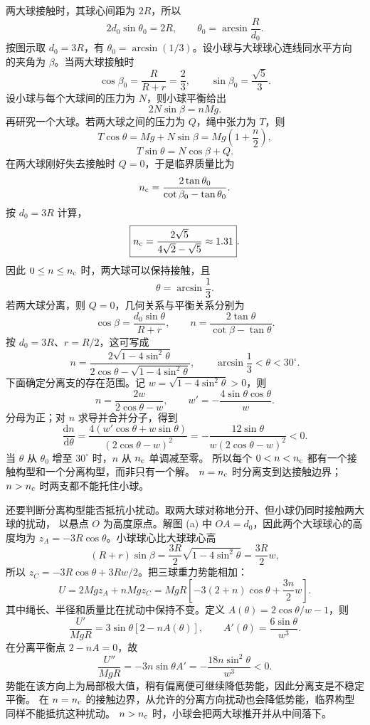 {\begin{xesolution}
两大球接触时，其球心间距为 $2R$，所以
\[
  2d_0\sin\theta_0=2R,
  \qquad
  \theta_0=\arcsin\frac{R}{d_0}.
\]
按图示取 $d_0=3R$，有 $\theta_0=\arcsin(1/3)$。设小球与大球球心连线同水平方向
的夹角为 $\beta$。当两大球接触时
\[
  \cos\beta_0=\frac{R}{R+r}=\frac23,
  \qquad
  \sin\beta_0=\frac{\sqrt5}{3}.
\]
设小球与每个大球间的压力为 $N$，则小球平衡给出
\[
  2N\sin\beta=nMg.
\]
再研究一个大球。若两大球之间的压力为 $Q$，绳中张力为 $T$，则
\[
  T\cos\theta=Mg+N\sin\beta=Mg\left(1+\frac n2\right),
\]
\[
  T\sin\theta=N\cos\beta+Q.
\]
在两大球刚好失去接触时 $Q=0$，于是临界质量比为
\[
  n_{\rm c}
  =\frac{2\tan\theta_0}{\cot\beta_0-\tan\theta_0}.
\]
按 $d_0=3R$ 计算，
\[
  \boxed{n_{\rm c}=\frac{2\sqrt5}{4\sqrt2-\sqrt5}\approx1.31}.
\]
因此 $0\le n\le n_{\rm c}$ 时，两大球可以保持接触，且
\[
  \boxed{\theta=\arcsin\frac13}.
\]
若两大球分离，则 $Q=0$，几何关系与平衡关系分别为
\[
  \cos\beta=\frac{d_0\sin\theta}{R+r},
  \qquad
  \boxed{n=\frac{2\tan\theta}{\cot\beta-\tan\theta}}.
\]
按 $d_0=3R$、$r=R/2$，这可写成
\[
  \boxed{n=\frac{2\sqrt{1-4\sin^2\theta}}
  {2\cos\theta-\sqrt{1-4\sin^2\theta}}},
  \qquad
  \arcsin\frac13<\theta<30^\circ.
\]
下面确定分离支的存在范围。记 $w=\sqrt{1-4\sin^2\theta}>0$，则
\[
 n=\frac{2w}{2\cos\theta-w},\qquad
 w'=-\frac{4\sin\theta\cos\theta}{w}.
\]
分母为正；对 $n$ 求导并合并分子，得到
\[
 \frac{\mathrm dn}{\mathrm d\theta}
 =\frac{4(w'\cos\theta+w\sin\theta)}{(2\cos\theta-w)^2}
 =-\frac{12\sin\theta}{w(2\cos\theta-w)^2}<0.
\]
当 $\theta$ 从 $\theta_0$ 增至 $30^\circ$ 时，$n$ 从 $n_{\rm c}$ 单调减至零。
所以每个 $0<n<n_{\rm c}$ 都有一个接触构型和一个分离构型，而非只有一个解。
$n=n_{\rm c}$ 时分离支到达接触边界；$n>n_{\rm c}$ 时两支都不能托住小球。

还要判断分离构型能否抵抗小扰动。取两大球对称地分开、但小球仍同时接触两大球的扰动，
以悬点 $O$ 为高度原点。解图 (a) 中 $OA=d_0$，因此两个大球球心的高度均为
$z_A=-3R\cos\theta$。小球球心比大球球心高
\[
 (R+r)\sin\beta=\frac{3R}{2}\sqrt{1-4\sin^2\theta}=\frac{3R}{2}w,
\]
所以 $z_C=-3R\cos\theta+3Rw/2$。把三球重力势能相加：
\[
 U=2Mgz_A+nMgz_C
 =MgR\left[-3(2+n)\cos\theta+\frac{3n}{2}w\right].
\]
其中绳长、半径和质量比在扰动中保持不变。定义
$A(\theta)=2\cos\theta/w-1$，则
\[
 \frac{U'}{MgR}=3\sin\theta[2-nA(\theta)],\qquad
 A'(\theta)=\frac{6\sin\theta}{w^3}.
\]
在分离平衡点 $2-nA=0$，故
\[
 \frac{U''}{MgR}=-3n\sin\theta A'
 =-\frac{18n\sin^2\theta}{w^3}<0.
\]
势能在该方向上为局部极大值，稍有偏离便可继续降低势能，因此分离支是不稳定平衡。
在 $n=n_{\rm c}$ 的接触边界，从允许的分离方向扰动也会降低势能，临界构型同样不能抵抗这种扰动。
$n>n_{\rm c}$ 时，小球会把两大球推开并从中间落下。
\end{xesolution}

}
